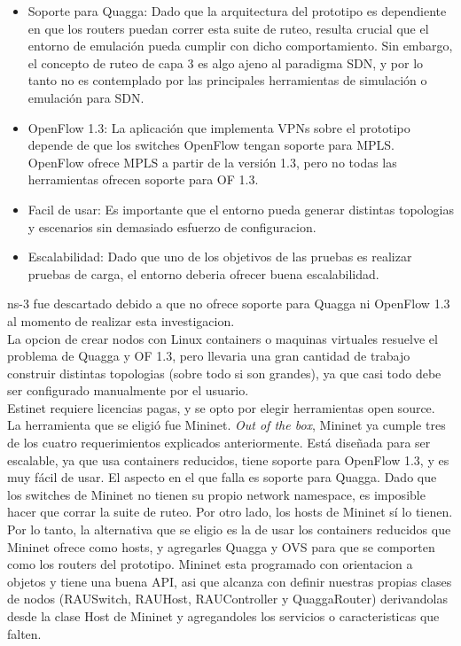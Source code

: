 \documentclass[a4paper,12pt]{report}
\begin{document}
\begin{itemize} 
	\item Soporte para Quagga: Dado que la arquitectura del prototipo es dependiente en que los routers puedan correr esta suite de ruteo, resulta crucial que el entorno de emulación pueda cumplir con dicho comportamiento. Sin embargo, el concepto de ruteo de capa 3 es algo ajeno al paradigma SDN, y por lo tanto no es contemplado por las principales herramientas de simulación o emulación para SDN.
	\item OpenFlow 1.3: La aplicación que implementa VPNs sobre el prototipo depende de que los switches OpenFlow tengan soporte para MPLS. OpenFlow ofrece MPLS a partir de la versión 1.3, pero no todas las herramientas ofrecen soporte para OF 1.3.
	\item Facil de usar: Es importante que el entorno pueda generar distintas topologias y escenarios sin demasiado esfuerzo de configuracion.
	\item Escalabilidad: Dado que uno de los objetivos de las pruebas es realizar pruebas de carga, el entorno deberia ofrecer buena escalabilidad.
\end{itemize}

ns-3 fue descartado debido a que no ofrece soporte para Quagga ni OpenFlow 1.3 al momento de realizar esta investigacion.\\

La opcion de crear nodos con Linux containers o maquinas virtuales resuelve el problema de Quagga y OF 1.3, pero llevaria una gran cantidad de trabajo construir distintas topologias (sobre todo si son grandes), ya que casi todo debe ser configurado manualmente por el usuario.\\

Estinet requiere licencias pagas, y se opto por elegir herramientas open source.\\

La herramienta que se eligió fue Mininet. \textit{Out of the box}, Mininet ya cumple tres de los cuatro requerimientos explicados anteriormente. Está diseñada para ser escalable, ya que usa containers reducidos, tiene soporte para OpenFlow 1.3, y es muy fácil de usar. El aspecto en el que falla es soporte para Quagga. Dado que los switches de Mininet no tienen su propio network namespace, es imposible hacer que corrar la suite de ruteo. Por otro lado, los hosts de Mininet sí lo tienen. Por lo tanto, la alternativa que se eligio es la de usar los containers reducidos que Mininet ofrece como hosts, y agregarles Quagga y OVS para que se comporten como los routers del prototipo. Mininet esta programado con orientacion a objetos y tiene una buena API, asi que alcanza con definir nuestras propias clases de nodos (RAUSwitch, RAUHost, RAUController y QuaggaRouter) derivandolas desde la clase Host de Mininet y agregandoles los servicios o caracteristicas que falten.
\end{document}
